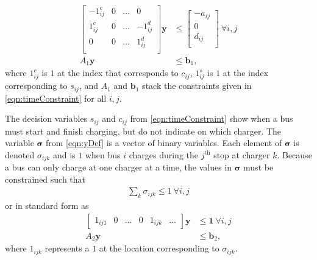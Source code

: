 \begin{equation} \begin{aligned}
	\begin{bmatrix}
		-1^c_{ij} & 0 & \hdots &  0        \\
	         1^c_{ij} & 0 & \hdots & -1^d_{ij} \\
		 0        & 0 & \hdots &  1^d_{ij} \\ 
	\end{bmatrix}
	\mathbf{y} &\le 
	\begin{bmatrix}
	        -a_{ij} \\ 
		 0      \\ 
		 d_{ij} \\
	\end{bmatrix} \ \forall i,j \\
	A_1\mathbf{y} &\le \mathbf{b}_1,
\end{aligned} \end{equation}
	where $1^{c}_{ij}$ is $1$ at the index that corresponds to $c_{ij}$, $1^s_{ij}$ is $1$ at the index corresponding to $s_{ij}$, and $A_1$ and $\mathbf{b}_1$ stack the constraints given in \eqref{eqn:timeConstraint} for all $i,j$.
	\par The decision variables $s_{ij}$ and $c_{ij}$ from \eqref{eqn:timeConstraint} show when a bus must start and finish charging, but do not indicate on which charger. The variable $\boldsymbol{\sigma}$ from \eqref{eqn:yDef} is a vector of binary variables. Each element of $\boldsymbol{\sigma}$ is denoted $\sigma_{ijk}$ and is $1$ when bus $i$ charges during the $j^{\text{th}}$ stop at charger $k$. Because a bus can only charge at one charger at a time, the values in $\boldsymbol{\sigma}$ must be constrained such that
\begin{equation}
	\begin{aligned}
		\sum_k \sigma_{ijk} \le 1 \ \forall i,j
	\end{aligned}
\end{equation} 
or in standard form as 
\begin{equation} \begin{aligned}
	\begin{bmatrix}1_{ij1} & 0 & \hdots & 0 & 1_{ijk} & \hdots \end{bmatrix} \mathbf{y} &\le \mathbf{1} \ \forall i,j\\
		A_2\mathbf{y} & \le \mathbf{b}_2,
\end{aligned} \end{equation}
where $1_{ijk}$ represents a $1$ at the location corresponding to $\sigma_{ijk}$.
